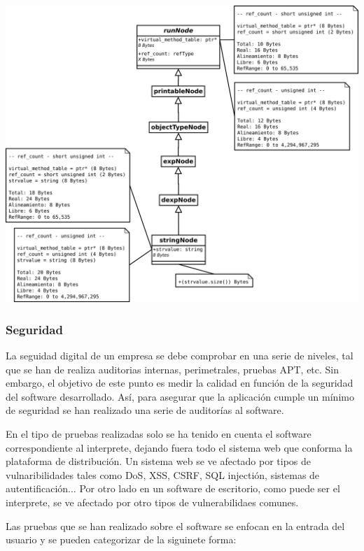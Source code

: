 \begin{center}
\includegraphics[scale=0.3]{memorySpaceStr.png} \\
\end{center}

\subsubsection{Seguridad}

La seguidad digital de un empresa se debe comprobar en una serie de niveles, tal que se han de realiza auditorias internas, perimetrales, pruebas APT, etc. Sin embargo, el objetivo de
este punto es medir la calidad en función de la seguridad del software desarrollado. Así, para asegurar que la aplicación cumple un mínimo de seguridad se han realizado una serie de 
auditorías al software. 

En el tipo de pruebas realizadas solo se ha tenido en cuenta el software correspondiente al interprete, dejando fuera todo el sistema web que conforma la plataforma de distribución. Un 
sistema web se ve afectado por tipos de vulnaribilidades tales como DoS, XSS, CSRF, SQL injectión, sistemas de autentificación... Por otro lado en un software de escritorio, como 
puede ser el interprete, se ve afectado por otro tipos de vulnerabilidaes comunes.

Las pruebas que se han realizado sobre el software se enfocan en la entrada del usuario y se pueden categorizar de la siguinete forma:

